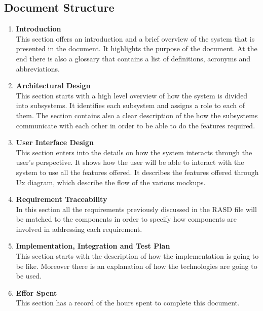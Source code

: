 \subsection{Document Structure}
\begin{enumerate}
    \item \textbf{Introduction}\\
            This section offers an introduction and a brief overview of the system that is presented in the document. 
            It highlights the purpose of the document.
            At the end there is also a glossary that contains a list of definitions, acronyms and abbreviations.
            
    \item \textbf{Architectural Design}\\
            This section starts with a high level overview of how the system is divided into subsystems. It identifies each subsystem
            and assigns a role to each of them. 
            The section contains also a clear description of the how the subsystems communicate with each other in order to 
            be able to do the features required.
            
    \item \textbf{User Interface Design}\\
            This section enters into the details on how the system interacts through the user’s perspective. 
            It shows how the user will be able to interact with the system to use all the features offered.
            It describes the features offered through Ux diagram, which describe the flow of the various mockups. 
            
    \item \textbf{Requirement Traceability}\\
        In this section all the requirements previously discussed in the RASD file will be matched to the components 
        in order to specify how components are involved in addressing each requirement.
            
    \item \textbf{Implementation, Integration and Test Plan}\\
        This section starts with the description of how the implementation is going to be like. 
        Moreover there is an explanation of how the technologies are going to be used.
            
    \item \textbf{Effor Spent}\\
            This section has a record of the hours spent to complete this document.

\end{enumerate}